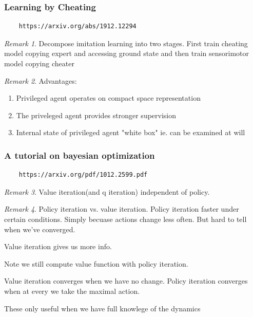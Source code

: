 \documentclass[11pt]{article}
\theoremstyle{remark}
\newtheorem{remark}{Remark}
\begin{document}
\subsubsection{Learning by Cheating}

\begin{verbatim}
	https://arxiv.org/abs/1912.12294
\end{verbatim}

\begin{remark}
	Decompose imitation learning into two stages. First train cheating model copying expert and accessing ground state and then train sensorimotor model copying cheater
\end{remark}

\begin{remark}
	Advantages:
	\begin{enumerate}
		\item Privileged agent operates on compact space representation
		\item The priveleged agent provides stronger supervision
		\item Internal state of privileged agent "white box" ie. can be examined at will
	\end{enumerate}
\end{remark}

\subsubsection{A tutorial on bayesian optimization}

\begin{verbatim}
	https://arxiv.org/pdf/1012.2599.pdf
\end{verbatim}

\begin{remark}
	Value iteration(and q iteration) independent of policy.
\end{remark}

\begin{remark}
	Policy iteration vs. value iteration. Policy iteration faster under certain conditions. Simply becuase actions change less often. But hard to tell when we've converged.

	Value iteration gives us more info. 

	Note we still compute value function with policy iteration.

	Value iteration converges when we have no change. Policy iteration converges when at every we take the maximal action. 

	These only useful when we have full knowlege of the dynamics
\end{remark}
\end{document}
